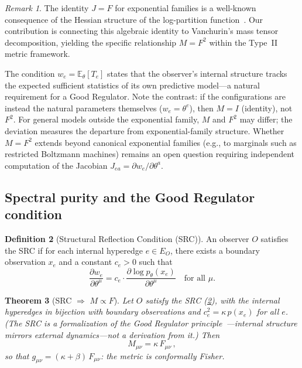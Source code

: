 \documentclass[11pt]{article}
\newtheorem{theorem}{Theorem}[section]
\theoremstyle{definition}
\newtheorem{definition}[theorem]{Definition}
\theoremstyle{remark}
\newtheorem{remark}[theorem]{Remark}
\begin{document}
\begin{remark}
The identity $J = F$ for exponential families is a well-known consequence
of the Hessian structure of the log-partition function~\cite{Amari2016}.
Our contribution is connecting this algebraic identity to Vanchurin's mass
tensor decomposition, yielding the specific relationship $M = F^2$ within
the Type~II metric framework.

The condition $w_e = \mathbb{E}_\theta[T_e]$ states that the observer's
internal structure tracks the expected sufficient statistics of its own
predictive model---a natural requirement for a Good Regulator.
Note the contrast: if the configurations are instead the natural
parameters themselves ($w_e = \theta^e$), then $M = I$ (identity),
not~$F^2$.
For general models outside the exponential family, $M$ and $F^2$
may differ; the deviation measures the departure from
exponential-family structure.
Whether $M = F^2$ extends beyond canonical exponential families
(e.g., to marginals such as restricted Boltzmann machines) remains
an open question requiring independent computation of the
Jacobian $J_{ea} = \partial w_e / \partial\theta^a$.
\end{remark}

\subsection{Spectral purity and the Good Regulator condition}
\label{sec:spectral-purity}

\begin{definition}[Structural Reflection Condition (SRC)]
\label{def:SRC}
An observer $O$ satisfies the SRC if for each internal hyperedge
$e \in E_O$, there exists a boundary observation $x_e$ and a constant
$c_e > 0$ such that
\[
\frac{\partial w_e}{\partial \theta^\mu} = c_e \cdot
\frac{\partial \log p_\theta(x_e)}{\partial \theta^\mu}
\quad \text{for all } \mu.
\]
\end{definition}

\begin{theorem}[SRC $\Rightarrow$ $M \propto F$]
\label{thm:SRC}
Let $O$ satisfy the SRC (\cref{def:SRC}), with the internal hyperedges in
bijection with boundary observations and
$c_e^2 = \kappa\, p(x_e)$ for all $e$.
(The SRC is a formalization of the Good Regulator
principle~\cite{ConantAshby1970,Virgo2025}---internal structure mirrors
external dynamics---not a derivation from it.)
Then
\begin{equation}
\label{eq:M-prop-F}
M_{\mu\nu} = \kappa\, F_{\mu\nu}\,,
\end{equation}
so that $g_{\mu\nu} = (\kappa + \beta)\, F_{\mu\nu}$:
the metric is conformally Fisher.
\end{theorem}
\end{document}
